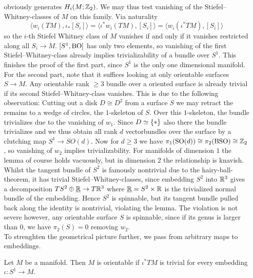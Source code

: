     obviously generates $H_i(M;\mathbb{Z}_2)$.
    We may thus test vanishing of the Stiefel--Whitney-classes of $M$ on this family.
    Via naturality
    \begin{equation*}
        \langle w_i(TM), \iota_\ast[S_i] \rangle = \langle \iota^\ast w_i(TM), [S_i] \rangle = \langle w_i(\iota^\ast TM),[S_i]\rangle 
    \end{equation*}
    so the $i$-th Stiefel Whitney class of $M$ vanishes if and only if it vanishes restricted along all $S_i \to M$.
    $[S^1,\mathrm{BO}]$ has only two elements, so vanishing of the first Stiefel--Whitney-class already implies trivializability of a bundle over $S^1$.
    This finishes the proof of the first part, since $S^1$ is the only one dimensional manifold.\\
    For the second part, note that it suffices looking at only orientable surfaces $S \to M$. 
    Any orientable rank $\geq 3$ bundle over a oriented surface is already trivial if its second Stiefel--Whitney-class vanishes.
    This is due to the following observation:
    Cutting out a disk $D\cong D^2$ from a surface $S$ we may retract the remains to a wedge of circles, the $1$-skeleton of $S$.
    Over this $1$-skeleton, the bundle trivializes due to the vanishing of $w_1$.
    Since $D\simeq \{\ast\}$ also there the bundle trivializes and we thus obtain all rank $d$ vectorbundles over the surface by a clutching map $S^1 \to SO(d)$.
    Now for $d\geq 3$ we have $\pi_1(\mathrm{SO}(d)) \cong \pi_2(\mathrm{BSO}) \cong \mathbb{Z}_2$, so vanishing of $w_2$ implies trivializability.
\endprf
For manifolds of dimension $1$ the lemma of course holds vacuously, but in dimension $2$ the relationship is knavish.
Whilst the tangent bundle of $S^2$ is famously nontrivial due to the hairy-ball-theorem, it has trivial Stiefel--Whitney-classes, since embedding $S^2$ into $\mathbb{R}^3$ gives a decomposition $TS^2 \oplus \underline{\mathbb{R}} \to T\mathbb{R}^3$ where $\underline{\mathbb{R}} = S^2\times\mathbb{R}$ is the trivialized normal bundle of the embedding.
Hence $S^2$ is spinnable, but its tangent bundle pulled back along the identity is nontrivial, violating the lemma.
The violation is not severe however, any orientable surface $S$ is spinnable, since if its genus is larger than $0$, we have $\pi_2(S) = 0$ removing $w_2$.\\
To strenghten the geometrical picture further, we pass from arbitrary maps to embeddings.
\begin{thesisprop}\label{orgeom}
    Let $M$ be a manifold. Then $M$ is orientable if $\iota^\ast TM$ is trivial for every embedding $\iota\colon S^1 \to M$.
\end{thesisprop}
